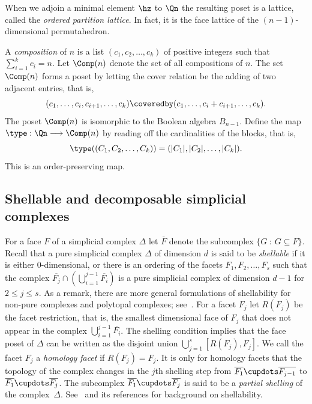 When we adjoin a minimal element $\hz$ to $\Qn$
the resulting poset is a lattice,
called the \emph{ordered partition lattice}. In fact, it is
the face lattice of the $(n-1)$-dimensional permutahedron.


A \emph{composition} of $n$ is a list 
$(c_{1}, c_{2}, \ldots, c_{k})$ of positive integers
such that $\sum_{i=1}^{k} c_{i} = n$.
Let $\Comp(n)$ denote the set of all compositions of $n$.
The set $\Comp(n)$ forms a poset by letting
the cover relation be the adding of two adjacent entries,
that is,
$$
(c_{1}, \ldots, c_{i}, c_{i+1}, \ldots, c_{k})
\coveredby
(c_{1}, \ldots, c_{i} + c_{i+1}, \ldots, c_{k}) .
$$
The poset $\Comp(n)$ is isomorphic to the Boolean algebra $B_{n-1}$.
Define the map $\type : \Qn \longrightarrow \Comp(n)$
by reading off the cardinalities of the blocks, that is,
$$ \type((C_{1}, C_{2}, \ldots, C_{k})) = (|C_{1}|, |C_{2}|, \ldots, |C_{k}|) . $$
This is an order-preserving map. 

\subsection{Shellable and decomposable simplicial complexes}

For a face $F$ of a simplicial complex $\Delta$
let $\overline{F}$ denote the subcomplex
$\{G \: : \: G \subseteq F\}$.
Recall that a pure simplicial complex $\Delta$ 
of dimension $d$ is said to be
\emph{shellable} if 
it is either $0$-dimensional, or
there is an ordering of the facets $F_{1}, F_{2}, \ldots, F_{s}$
such that  the complex
$\overline{F_{j}} \cap \left(\bigcup_{i=1}^{j-1} \overline{F_{i}}\right)$
is a pure simplicial complex of dimension $d-1$ for $2 \leq j \leq s$.
As a remark, there are more general formulations of 
shellability for non-pure
complexes and polytopal complexes; see~\cite{Bjorner_Wachs}.
For a facet $F_{j}$ let $R(F_{j})$ be the 
facet restriction, that is, the smallest dimensional face
of $F_{j}$ that does not appear in the complex
$\bigcup_{i=1}^{j-1} \overline{F_{i}}$.
The shelling condition implies
that the face poset of $\Delta$ can be written as the disjoint union
$\bigcup_{j=1}^{s} [R(F_{j}), F_{j}]$.
We call the facet $F_{j}$ a \emph{homology facet}
if $R(F_{j}) = F_{j}$.
It is only for homology facets that the topology
of the complex 
changes in the $j$th shelling step from
$\overline{F_{1}} \cupdots \overline{F_{j-1}}$
to
$\overline{F_{1}} \cupdots \overline{F_{j}}$.
The subcomplex
$\overline{F_{1}} \cupdots \overline{F_{j}}$
is said to be a
\emph{partial shelling} 
of the complex~$\Delta$.
See~\cite{Bjorner,Stanley_green} and its references for background on shellability.


